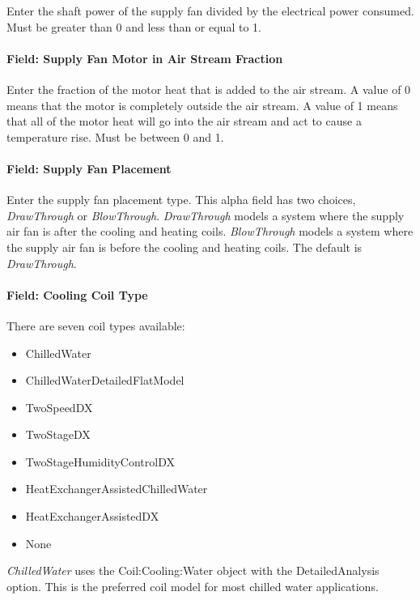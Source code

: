 Enter the shaft power of the supply fan divided by the electrical power consumed. Must be greater than 0 and less than or equal to 1.

\paragraph{Field: Supply Fan Motor in Air Stream Fraction}\label{field-supply-fan-motor-in-air-stream-fraction-7}

Enter the fraction of the motor heat that is added to the air stream. A value of 0 means that the motor is completely outside the air stream. A value of 1 means that all of the motor heat will go into the air stream and act to cause a temperature rise. Must be between 0 and 1.

\paragraph{Field: Supply Fan Placement}\label{field-supply-fan-placement-10}

Enter the supply fan placement type. This alpha field has two choices, \emph{DrawThrough} or \emph{BlowThrough}. \emph{DrawThrough} models a system where the supply air fan is after the cooling and heating coils. \emph{BlowThrough} models a system where the supply air fan is before the cooling and heating coils. The default is \emph{DrawThrough}.

\paragraph{Field: Cooling Coil Type}\label{field-cooling-coil-type-12}

There are seven coil types available:

\begin{itemize}
\item
  ChilledWater
\item
  ChilledWaterDetailedFlatModel
\item
  TwoSpeedDX
\item
  TwoStageDX
\item
  TwoStageHumidityControlDX
\item
  HeatExchangerAssistedChilledWater
\item
  HeatExchangerAssistedDX
\item
  None
\end{itemize}

\emph{ChilledWater} uses the Coil:Cooling:Water object with the DetailedAnalysis option. This is the preferred coil model for most chilled water applications.

